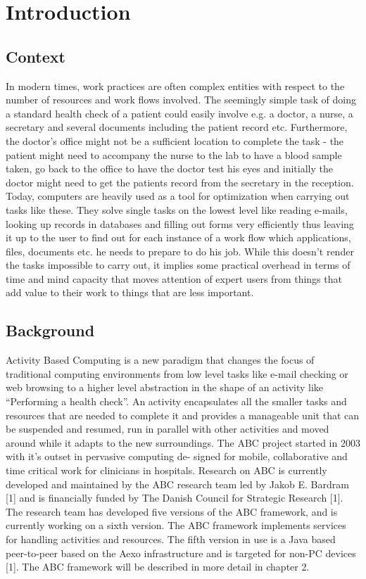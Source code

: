 \chapter{Introduction}

\section{Context}
In modern times, work practices are often complex entities with respect to the number of resources and work flows involved. The seemingly simple task of doing a standard health check of a patient could easily involve e.g. a doctor, a nurse, a secretary and several documents including the patient record etc. Furthermore, the doctor’s office might not be a sufficient location to complete the task - the patient might need to accompany the nurse to the lab to have a blood sample taken, go back to the office to have the doctor test his eyes and initially the doctor might need to get the patients record from the secretary in the reception.
Today, computers are heavily used as a tool for optimization when carrying out tasks like these. They solve single tasks on the lowest level like reading e-mails, looking up records in databases and filling out forms very efficiently thus leaving it up to the user to find out for each instance of a work flow which applications, files, documents etc. he needs to prepare to do his job. While this doesn’t render the tasks impossible to carry out, it implies some practical overhead in terms of time and mind capacity that moves attention of expert users from things that add value to their work to things that are less important.

\section{Background}
Activity Based Computing is a new paradigm that changes the focus of traditional computing environments from low level tasks like e-mail checking or web browsing to a higher level abstraction in the shape of an activity like “Performing a health check”. An activity encapsulates all the smaller tasks and resources that are needed to complete it and provides a manageable unit that can be suspended and resumed, run in parallel with other activities and moved around while it adapts to the new surroundings.
The ABC project started in 2003 with it’s outset in pervasive computing de- signed for mobile, collaborative and time critical work for clinicians in hospitals. Research on ABC is currently developed and maintained by the ABC research team led by Jakob E. Bardram [1] and is financially funded by The Danish Council for Strategic Research [1]. The research team has developed five versions of the ABC framework, and is currently working on a sixth version. The ABC framework implements services for handling activities and resources. The fifth version in use is a Java based peer-to-peer based on the Aexo infrastructure and is targeted for non-PC devices [1]. The ABC framework will be described in more detail in chapter 2.

